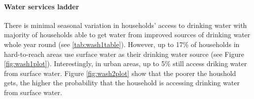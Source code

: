 \documentclass[12pt,a4paper]{article}
\let\oldparagraph\paragraph
\renewcommand{\paragraph}[1]{\oldparagraph{#1}\mbox{}}
\begin{document}
\hypertarget{water-results}{%
\paragraph{Water services ladder}\label{water-results}}

There is minimal seasonal variation in households' access to drinking water with majority of households able to get water from improved sources of drinking water whole year round (see \ref{tab:wash1table}). However, up to 17\% of households in hard-to-reach areas use surface water as their drinking water source (see Figure \ref{fig:wash1plot}). Interestingly, in urban areas, up to 5\% still access driking water from surface water. Figure \ref{fig:wash2plot} show that the poorer the houshold gets, the higher the probability that the household is accessing drinking water from surface water.
\end{document}

